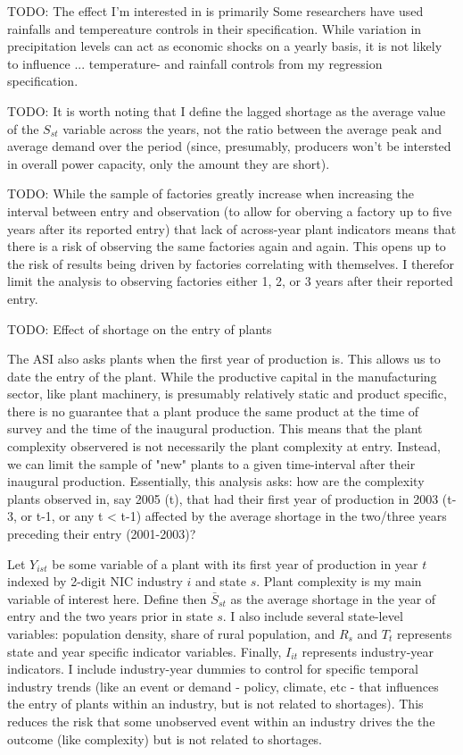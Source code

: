 \documentclass[11pt]{article}
\begin{document}
TODO: The effect I'm interested in is primarily 
Some researchers have used rainfalls and tempereature controls in their specification. While variation in precipitation levels can act as economic shocks on a yearly basis, it is not likely to influence ... 
temperature- and rainfall controls from my regression specification.

TODO: It is worth noting that I define the lagged shortage as the average value of the $S_{st}$ variable across the years, not the ratio between the average peak and average demand over the period (since, presumably, producers won't be intersted in overall power capacity, only the amount they are short).

TODO: While the sample of factories greatly increase when increasing the interval between entry and observation (to allow for oberving a factory up to five years after its reported entry) that lack of across-year plant indicators means that there is a risk of observing the same factories again and again. This opens up to the risk of results being driven by factories correlating with themselves. I therefor limit the analysis to observing factories either 1, 2, or 3 years after their reported entry.

TODO: Effect of shortage on the entry of plants

The ASI also asks plants when the first year of production is. This allows us to date the entry of the plant. While the productive capital in the manufacturing sector, like plant machinery, is presumably  relatively static and product specific, there is no guarantee that a plant produce the same product at the time of survey and the time of the inaugural production. This means that the plant complexity observered is not necessarily the plant complexity at entry. Instead, we can limit the sample of "new" plants to a given time-interval after their inaugural production. Essentially, this analysis asks: how are the complexity plants observed in, say 2005 (t), that had their first year of production in 2003 (t-3, or t-1, or any t < t-1) affected by the average shortage in the two/three years preceding their entry (2001-2003)?

Let $Y_{ist}$ be some variable of a plant with its first year of production in year $t$ indexed by 2-digit NIC industry $i$ and state $s$. Plant complexity is my main variable of interest here. Define then $\bar{S}_{st}$ as the average shortage in the year of entry and the two years prior in state $s$. I also include several state-level variables: population density, share of rural population, and 
$R_{s}$ and $T_{t}$ represents state and year specific indicator variables. Finally, $I_{it}$ represents industry-year indicators. I include industry-year dummies to control for specific temporal industry trends (like an event or demand - policy, climate, etc - that influences the entry of plants within an industry, but is not related to shortages). This reduces the risk that some unobserved event within an industry drives the the outcome (like complexity) but is not related to shortages.
\end{document}
